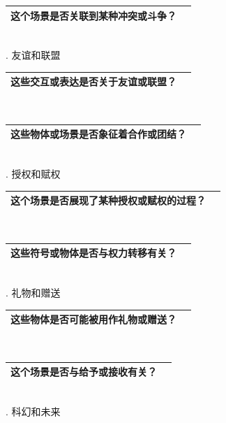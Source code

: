 \documentclass[12pt]{book}
\begin{document}
\begin{tabular}{|p{15cm}|p{3cm}|}
	\hline
这个场景是否关联到某种冲突或斗争？\\
	\hline
\end{tabular}\\



. 友谊和联盟

\begin{tabular}{|p{15cm}|p{3cm}|}
	\hline
这些交互或表达是否关于友谊或联盟？\\
	\hline
\end{tabular}\\


\begin{tabular}{|p{15cm}|p{3cm}|}
	\hline
这些物体或场景是否象征着合作或团结？\\
	\hline
\end{tabular}\\



. 授权和赋权

\begin{tabular}{|p{15cm}|p{3cm}|}
	\hline
这个场景是否展现了某种授权或赋权的过程？\\
	\hline
\end{tabular}\\



\begin{tabular}{|p{15cm}|p{3cm}|}
	\hline
这些符号或物体是否与权力转移有关？\\
	\hline
\end{tabular}\\



. 礼物和赠送

\begin{tabular}{|p{15cm}|p{3cm}|}
	\hline
这些物体是否可能被用作礼物或赠送？\\
	\hline
\end{tabular}\\



\begin{tabular}{|p{15cm}|p{3cm}|}
	\hline
这个场景是否与给予或接收有关？\\
	\hline
\end{tabular}\\



. 科幻和未来
\end{document}
